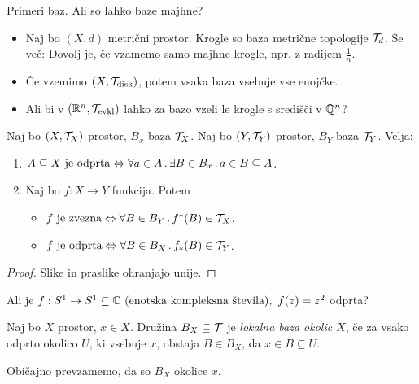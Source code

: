 \begin{primer}
    Primeri baz. Ali so lahko baze majhne?
    \begin{itemize}
        \item Naj bo $(X, d)$ metrični prostor. Krogle so baza metrične topologije $\mathcal{T}_d$. Še več: Dovolj je, če vzamemo samo majhne krogle, npr. z radijem $\frac{1}{n}$.
        \item Če vzemimo $(X, \mathcal{T}_\text{disk})$, potem vsaka baza vsebuje vse enojčke.
        \item Ali bi v $(\mathbb{R}^n, \mathcal{T}_\text{evkl})$ lahko za bazo vzeli le krogle s središči v $\mathbb{Q}^n$?
    \end{itemize}
\end{primer}

\begin{trditev}
    Naj bo $(X, \mathcal{T}_X)$ prostor, $B_x$ baza $\mathcal{T}_X$. Naj bo $(Y, \mathcal{T}_Y)$ prostor, $B_Y$ baza $\mathcal{T}_Y$. Velja:
    \begin{enumerate}
        \item $A \subseteq X \text{ je odprta} \Leftrightarrow \forall a \in A \,.\, \exists B \in B_x \,.\, a \in B \subseteq A$.
        \item Naj bo $f: X \to Y$ funkcija. Potem
        \begin{itemize}
            \item $f \text{ je zvezna} \Leftrightarrow \forall B \in B_Y \,.\, f^{*}(B) \in \mathcal{T}_X$.
            \item $f \text{ je odprta} \Leftrightarrow \forall B \in B_X \,.\, f_{*}(B) \in \mathcal{T}_Y$.
        \end{itemize}
    \end{enumerate}
\end{trditev}

\begin{proof}
    Slike in praslike ohranjajo unije.
\end{proof}

\begin{primer}
    Ali je $f: S^1 \to S^1 \subseteq \mathbb{C} \text{ (enotska kompleksna števila)}, \ f(z) = z^2$ odprta?
\end{primer}

\begin{definicija}
    Naj bo $X$ prostor, $x \in X$. Družina $B_X \subseteq \mathcal{T}$ je \emph{lokalna baza okolic $X$}, če za vsako odprto okolico $U$, ki vsebuje $x$, obstaja $B \in B_X$, da $x \in B \subseteq U$. 
\end{definicija}

\begin{opomba}
    Običajno prevzamemo, da so $B_X$ okolice $x$.
\end{opomba}

